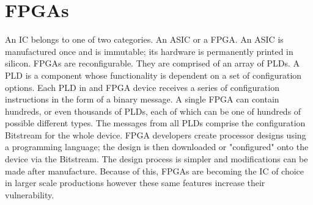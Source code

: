 \section{\acrfull{FPGAs}}
An \acrshort{IC} belongs to one of two categories.
An \acrfull{ASIC} or a \acrfull{FPGA}.
An \acrshort{ASIC} is manufactured once and is immutable; its hardware is permanently printed in silicon.
\acrshort{FPGA}s are reconfigurable.
They are comprised of an array of \acrfull{PLDs}.
A \acrshort{PLD} is a component whose functionality is dependent on a set of configuration options.
Each \acrshort{PLD} in and \acrshort{FPGA} device receives a series of configuration instructions in the form of a binary message.
A single \acrshort{FPGA} can contain hundreds, or even thousands of \acrshort{PLD}s, each of which can be one of hundreds of possible different types.
The messages from all \acrshort{PLD}s comprise the configuration \gls{Bitstream} for the whole device. 
\acrshort{FPGA} developers create processor designs using a programming language; the design is then downloaded or "configured" onto the device via the \gls{Bitstream}.
The design process is simpler and modifications can be made after manufacture.
Because of this, \acrshort{FPGA}s are becoming the \acrshort{IC} of choice in larger scale productions however these same features increase their vulnerability.


\setlength{\unitlength}{\savedunitlength}
